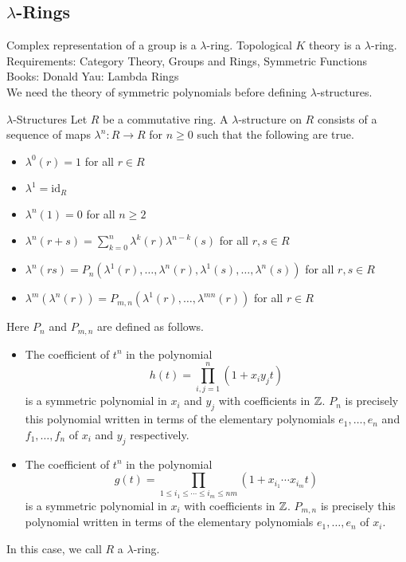\documentclass[a4paper]{article}
\begin{document}
\subsection{$\lambda$-Rings}
Complex representation of a group is a $\lambda$-ring. Topological $K$ theory is a $\lambda$-ring. \\

Requirements: Category Theory, Groups and Rings, Symmetric Functions\\
Books: Donald Yau: Lambda Rings\\

We need the theory of symmetric polynomials before defining $\lambda$-structures. 

\begin{defn}{$\lambda$-Structures}{} Let $R$ be a commutative ring. A $\lambda$-structure on $R$ consists of a sequence of maps $\lambda^n:R\to R$ for $n\geq 0$ such that the following are true. 
\begin{itemize}
\item $\lambda^0(r)=1$ for all $r\in R$
\item $\lambda^1=\text{id}_R$
\item $\lambda^n(1)=0$ for all $n\geq 2$
\item $\lambda^n(r+s)=\sum_{k=0}^n\lambda^k(r)\lambda^{n-k}(s)$ for all $r,s\in R$
\item $\lambda^n(rs)=P_n(\lambda^1(r),\dots,\lambda^n(r),\lambda^1(s),\dots,\lambda^n(s))$ for all $r,s\in R$
\item $\lambda^m(\lambda^n(r))=P_{m,n}(\lambda^1(r),\dots,\lambda^{mn}(r))$ for all $r\in R$
\end{itemize}
Here $P_n$ and $P_{m,n}$ are defined as follows. 
\begin{itemize}
\item The coefficient of $t^n$ in the polynomial $$h(t)=\prod_{i,j=1}^n(1+x_iy_jt)$$ is a symmetric polynomial in $x_i$ and $y_j$ with coefficients in $\mathbb{Z}$. $P_n$ is precisely this polynomial written in terms of the elementary polynomials $e_1,\dots,e_n$ and $f_1,\dots,f_n$ of $x_i$ and $y_j$ respectively. 
\item The coefficient of $t^n$ in the polynomial $$g(t)=\prod_{1\leq i_1\leq\cdots\leq i_m\leq nm}(1+x_{i_1}\cdots x_{i_m}t)$$ is a symmetric polynomial in $x_i$ with coefficients in $\mathbb{Z}$. $P_{m,n}$ is precisely this polynomial written in terms of the elementary polynomials $e_1,\dots,e_n$ of $x_i$. 
\end{itemize}
In this case, we call $R$ a $\lambda$-ring. 
\end{defn}
\end{document}
